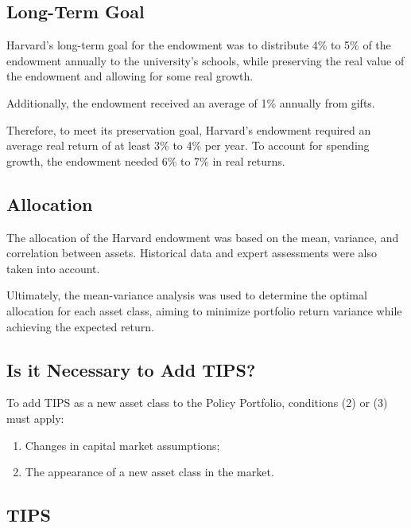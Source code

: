 \documentclass{article}
\begin{document}
\hypertarget{long-term-goal}{%
\subsection{Long-Term Goal}\label{long-term-goal}}

Harvard's long-term goal for the endowment was to distribute 4\% to 5\%
of the endowment annually to the university's schools, while preserving
the real value of the endowment and allowing for some real growth.

Additionally, the endowment received an average of 1\% annually from
gifts.

Therefore, to meet its preservation goal, Harvard's endowment required
an average real return of at least 3\% to 4\% per year. To account for
spending growth, the endowment needed 6\% to 7\% in real returns.

\hypertarget{allocation}{%
\subsection{Allocation}\label{allocation}}

The allocation of the Harvard endowment was based on the mean, variance,
and correlation between assets. Historical data and expert assessments
were also taken into account.

Ultimately, the mean-variance analysis was used to determine the optimal
allocation for each asset class, aiming to minimize portfolio return
variance while achieving the expected return.

\hypertarget{is-it-necessary-to-add-tips}{%
\subsection{Is it Necessary to Add
TIPS?}\label{is-it-necessary-to-add-tips}}

To add TIPS as a new asset class to the Policy Portfolio, conditions (2)
or (3) must apply:
\begin{enumerate}
    \item Changes in capital market assumptions; 
    \item The
    appearance of a new asset class in the market.
\end{enumerate}

\hypertarget{tips}{%
\subsection{TIPS}\label{tips}}
\end{document}
